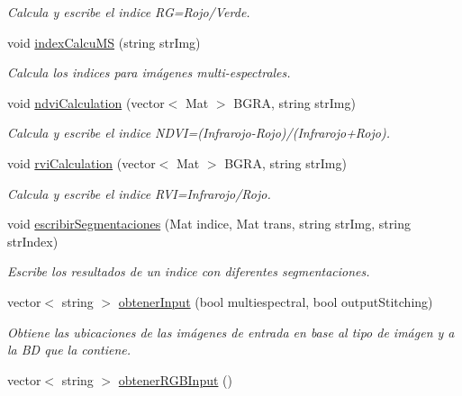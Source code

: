 \begin{DoxyCompactItemize}
\begin{DoxyCompactList}\small\item\em Calcula y escribe el indice RG=Rojo/\+Verde. \end{DoxyCompactList}\item 
void \mbox{\hyperlink{classIndexCalculation_a9c19fb3bdd84afb8769c90a1e31857b3}{index\+Calcu\+MS}} (string str\+Img)
\begin{DoxyCompactList}\small\item\em Calcula los indices para imágenes multi-\/espectrales. \end{DoxyCompactList}\item 
void \mbox{\hyperlink{classIndexCalculation_a4d727b91eeb0676b3ffcfaf26ec02a32}{ndvi\+Calculation}} (vector$<$ Mat $>$ B\+G\+RA, string str\+Img)
\begin{DoxyCompactList}\small\item\em Calcula y escribe el indice N\+D\+VI=(Infrarojo-\/\+Rojo)/(Infrarojo+\+Rojo). \end{DoxyCompactList}\item 
void \mbox{\hyperlink{classIndexCalculation_abd44fe3dd27ccd9641f29152fdf19a2e}{rvi\+Calculation}} (vector$<$ Mat $>$ B\+G\+RA, string str\+Img)
\begin{DoxyCompactList}\small\item\em Calcula y escribe el indice R\+VI=Infrarojo/\+Rojo. \end{DoxyCompactList}\item 
void \mbox{\hyperlink{classIndexCalculation_acb0a9e1ded8f0d9550e7dad18e66058c}{escribir\+Segmentaciones}} (Mat indice, Mat trans, string str\+Img, string str\+Index)
\begin{DoxyCompactList}\small\item\em Escribe los resultados de un indice con diferentes segmentaciones. \end{DoxyCompactList}\item 
vector$<$ string $>$ \mbox{\hyperlink{classIndexCalculation_a65a88228b2caf575cbbac793a03d1dd6}{obtener\+Input}} (bool multiespectral, bool output\+Stitching)
\begin{DoxyCompactList}\small\item\em Obtiene las ubicaciones de las imágenes de entrada en base al tipo de imágen y a la BD que la contiene. \end{DoxyCompactList}\item 
vector$<$ string $>$ \mbox{\hyperlink{classIndexCalculation_aacf5294ab87007a511f9f9e9772855af}{obtener\+R\+G\+B\+Input}} ()

\end{DoxyCompactItemize}
